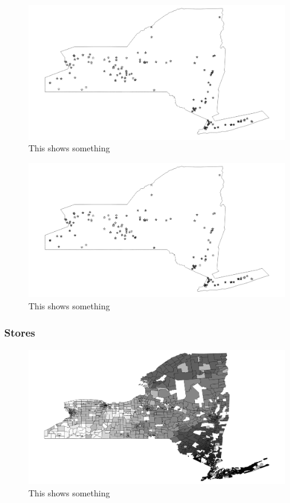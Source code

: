 \documentclass{report}
\begin{document}
\begin{figure}
\centering
\begin{framed}
\includegraphics[scale=.4]{procs_243_66}
\caption{This shows something}
\end{framed}
\end{figure}

\begin{figure}
\centering
\begin{framed}
\includegraphics[scale=.4]{procs_243_69}
\caption{This shows something}
\end{framed}
\end{figure}

\subsubsection{Stores}

\begin{figure}
\centering
\begin{framed}
\includegraphics[scale=.4]{stores_243_49}
\caption{This shows something}
\end{framed}
\end{figure}
\end{document}
